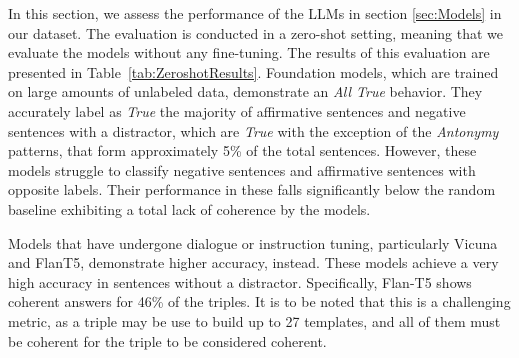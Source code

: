 \documentclass[11pt]{article}
\begin{document}
In this section, we assess the performance of the LLMs in section \ref{sec:Models} in our dataset. The evaluation is conducted in a zero-shot setting, meaning that we evaluate the models without any fine-tuning. The results of this evaluation are presented in Table~\ref{tab:ZeroshotResults}. 
Foundation models, which are trained on large amounts of unlabeled data, demonstrate an \textit{All True} behavior. They accurately label as \textit{True} the majority of affirmative sentences and negative sentences with a distractor, which are \textit{True} with the exception of the \textit{Antonymy} patterns, that form approximately 5\% of the total sentences. However, these models struggle to classify negative sentences and affirmative sentences with opposite labels. Their performance in these falls significantly below the random baseline exhibiting a total lack of coherence by the models. 

\begin{table}[tb]
 \small
 \centering
\caption{Accuracy of Flan-T5-xxl and Vicuna13B in the Synonymy and Antonymy patterns. We evaluate the models in affirmative and negative sentences without distractors. Scores that surpass the Random baseline are indicated with \underline{underline}.}
\label{tab:Zeroshot1234}
\end{table} 
Models that have undergone dialogue or instruction tuning, particularly Vicuna and FlanT5, demonstrate higher accuracy, instead. These models achieve a very high accuracy in sentences without a distractor. Specifically, Flan-T5 shows coherent answers for 46\% of the triples. It is to be noted that this is a challenging metric, as a triple may be use to build up to 27 templates, and all of them must be coherent for the triple to be considered coherent. 
\end{document}
